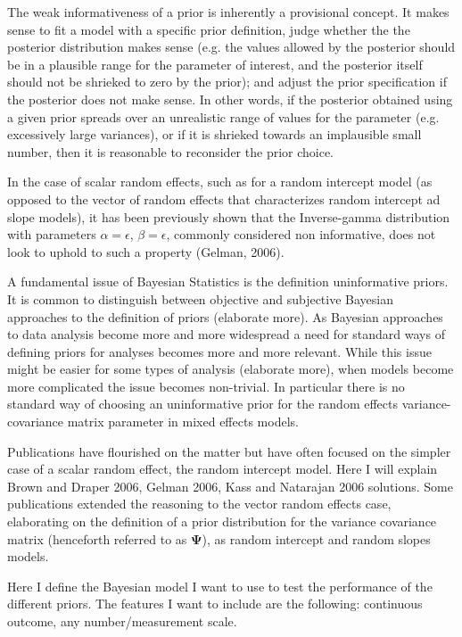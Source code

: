 \documentclass[a4paper]{article}
\begin{document}
The weak informativeness of a prior is inherently a provisional concept.
It makes sense to fit a model with a specific prior definition,
judge whether the the posterior distribution makes sense (e.g.
the values allowed by the posterior should be in a plausible range 
for the parameter of interest, and the posterior itself should not
be shrieked to zero by the prior); and adjust the prior specification
if the posterior does not make sense. In other words, if the posterior
obtained using a given prior spreads over an unrealistic range of values
for the parameter (e.g. excessively large variances), or if it is shrieked
towards an implausible small number, then it is reasonable to reconsider
the prior choice.

In the case of scalar random effects, such as for a random intercept
model (as opposed to the vector of random effects that characterizes
random intercept ad slope models), it has been previously shown that 
the Inverse-gamma distribution with parameters $\alpha = \epsilon$, 
$\beta = \epsilon$, commonly considered non informative, does not look
to uphold to such a property (Gelman, 2006).

A fundamental issue of Bayesian Statistics is the definition 
uninformative priors. It is common to distinguish between 
objective and subjective Bayesian approaches to the definition 
of priors (elaborate more).  As Bayesian approaches to data 
analysis become more and more widespread a need for standard 
ways of defining priors for analyses becomes more and more 
relevant. While this issue might be easier for some types of 
analysis (elaborate more), when models become more complicated 
the issue becomes non-trivial.  In particular there is no 
standard way of choosing an uninformative prior for the random 
effects variance-covariance matrix parameter in mixed effects 
models.

Publications have flourished on the matter but have often 
focused on the simpler case of a scalar random effect, the random 
intercept model. Here I will explain Brown and Draper 2006, 
Gelman 2006, Kass and Natarajan 2006 solutions.
Some publications extended the reasoning to the vector random 
effects case, elaborating on the definition of a prior distribution 
for the variance covariance matrix (henceforth referred to as 
$\bm{\Psi}$), as random intercept and random slopes models.

Here I define the Bayesian model I want to use to test the performance 
of the different priors. The features I want to include are the 
following: continuous outcome, any number/measurement scale.
\end{document}
